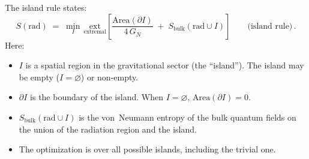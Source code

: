 \documentclass[11pt,letterpaper]{article}
\theoremstyle{plain}
\theoremstyle{definition}
\theoremstyle{remark}
\begin{document}
The island rule states:
\begin{equation}
\label{eq04:island_rule}
\boxed{
S(\mathrm{rad}) \;=\; \min_{I}\,\underset{\text{extremal}}{\mathrm{ext}}
\left[
  \frac{\mathrm{Area}(\partial I)}{4\,G_{N}}
  \;+\; S_{\mathrm{bulk}}(\mathrm{rad} \cup I)
\right]
}
\qquad\text{(island rule)}\,.
\end{equation}
Here:
\begin{itemize}
\item $I$ is a spatial region in the gravitational sector (the
  ``island'').  The island may be empty ($I = \varnothing$) or
  non-empty.
\item $\partial I$ is the boundary of the island.  When $I =
  \varnothing$, $\mathrm{Area}(\partial I) = 0$.
\item $S_{\mathrm{bulk}}(\mathrm{rad}\cup I)$ is the von~Neumann
  entropy of the bulk quantum fields on the union of the radiation
  region and the island.
\item The optimization is over all possible islands, including the
  trivial one.
\end{itemize}
\end{document}

